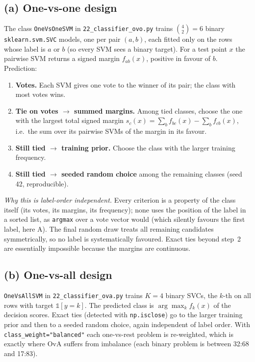 \documentclass[11pt]{article}
\begin{document}
\subsection{(a) One-vs-one design}
The class \texttt{OneVsOneSVM} in \texttt{22\_classifier\_ovo.py} trains
$\binom{4}{2}=6$ binary \texttt{sklearn.svm.SVC} models, one per pair $(a,b)$, each fitted only on
the rows whose label is $a$ or $b$ (so every SVM sees a binary target). For a test point $x$ the
pairwise SVM returns a signed margin $f_{ab}(x)$, positive in favour of $b$. Prediction:
\begin{enumerate}
\item \textbf{Votes.} Each SVM gives one vote to the winner of its pair; the class with most votes wins.
\item \textbf{Tie on votes $\rightarrow$ summed margins.} Among tied classes, choose the one with the
largest total signed margin $s_c(x)=\sum_{b}f_{bc}(x)-\sum_{b}f_{cb}(x)$, i.e.\ the sum over its
pairwise SVMs of the margin in its favour.
\item \textbf{Still tied $\rightarrow$ training prior.} Choose the class with the larger training frequency.
\item \textbf{Still tied $\rightarrow$ seeded random choice} among the remaining classes (seed 42, reproducible).
\end{enumerate}
\emph{Why this is label-order independent.} Every criterion is a property of the class itself (its
votes, its margins, its frequency); none uses the position of the label in a sorted list, as
\texttt{argmax} over a vote vector would (which silently favours the first label, here A). The
final random draw treats all remaining candidates symmetrically, so no label is systematically
favoured. Exact ties beyond step~2 are essentially impossible because the margins are continuous.

\subsection{(b) One-vs-all design}
\texttt{OneVsAllSVM} in \texttt{22\_classifier\_ova.py} trains $K=4$ binary SVCs, the
$k$-th on all rows with target $\mathbb{1}[y=k]$. The predicted class is
$\arg\max_k f_k(x)$ of the decision scores. Exact ties (detected with \texttt{np.isclose}) go to the
larger training prior and then to a seeded random choice, again independent of label order.
With \texttt{class\_weight="balanced"} each one-vs-rest problem is re-weighted, which is exactly
where OvA suffers from imbalance (each binary problem is between 32:68 and 17:83).
\end{document}
